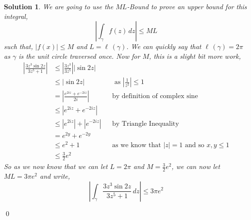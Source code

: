 \documentclass{article}
\newcommand{\g}{\gamma}
\newtheorem{solution}{Solution}
\begin{document}
\begin{solution}
  We are going to use the $ML$-Bound to prove an upper bound for this integral,
  $$ \left | \int_\g f(z)\,dz \right | \le ML$$
  such that, $|f(x)| \le M$ and $L = \ell\,(\g)$. We can quickly say that $\ell\,(\g) = 2\pi$ as $\g$ is the unit circle traversed once. Now for $M$, this is a slight bit more work,
  \begin{align*}
    \left | \frac{3z^3\sin {2z}}{3z^5 + 1} \right | &\le \left | \frac{3z^3}{3z^5} \right |\left| \sin {2z} \right| \\
    &\le |\sin 2z|&& \text{ as $\left|\frac{1}{z^2}\right| \le 1$}\\
    &= \left| \frac{e^{2iz} + e^{-2iz}}{2i} \right| && \text{by definition of complex sine}\\
    &\le \left| e^{2iz} + e^{-2iz} \right|\\
    &\le |e^{2iz}| + |e^{-2iz}| && \text{by Triangle Inequality}\\
    &= e^{2y} + e^{-2y}\\
    &\le e^2 + 1 && \text{as we know that $|z| = 1$ and so $x, y \le 1$}\\
    &\le \frac{3}{2}e^2
  \end{align*}
  So as we now know that we can let $L = 2\pi$ and $M = \frac{3}{2}e^2$, we can now let $ML = 3\pi e^2$ and write,
  $$ \left | \int_\g \frac{3z^3\sin {2z}}{3z^5 + 1}\,dz \right | \le 3\pi e^2 $$
\end{solution}\qed
\end{document}

